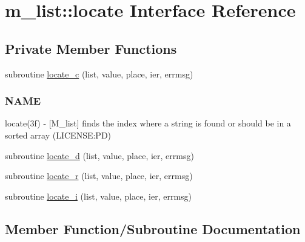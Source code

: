 \hypertarget{interfacem__list_1_1locate}{}\section{m\+\_\+list\+:\+:locate Interface Reference}
\label{interfacem__list_1_1locate}
\subsection*{Private Member Functions}
\begin{DoxyCompactItemize}
\item 
subroutine \mbox{\hyperlink{interfacem__list_1_1locate_a2d1682041c74cb7d468b5825e3bde1d1}{locate\+\_\+c}} (list, value, place, ier, errmsg)
\begin{DoxyCompactList}\small\item\em \subsubsection*{N\+A\+ME}

locate(3f) -\/ \mbox{[}M\+\_\+list\mbox{]} finds the index where a string is found or should be in a sorted array (L\+I\+C\+E\+N\+SE\+:PD) \end{DoxyCompactList}\item 
subroutine \mbox{\hyperlink{interfacem__list_1_1locate_a7e7b4cfcb8a8c34716711ce9ba2b29f9}{locate\+\_\+d}} (list, value, place, ier, errmsg)
\item 
subroutine \mbox{\hyperlink{interfacem__list_1_1locate_a23014daaa8ddc33946750235c976de4a}{locate\+\_\+r}} (list, value, place, ier, errmsg)
\item 
subroutine \mbox{\hyperlink{interfacem__list_1_1locate_afceca3ebd5e49e34831b80347b159066}{locate\+\_\+i}} (list, value, place, ier, errmsg)
\end{DoxyCompactItemize}


\subsection{Member Function/\+Subroutine Documentation}
\mbox{\label{interfacem__list_1_1locate_a2d1682041c74cb7d468b5825e3bde1d1}} 
